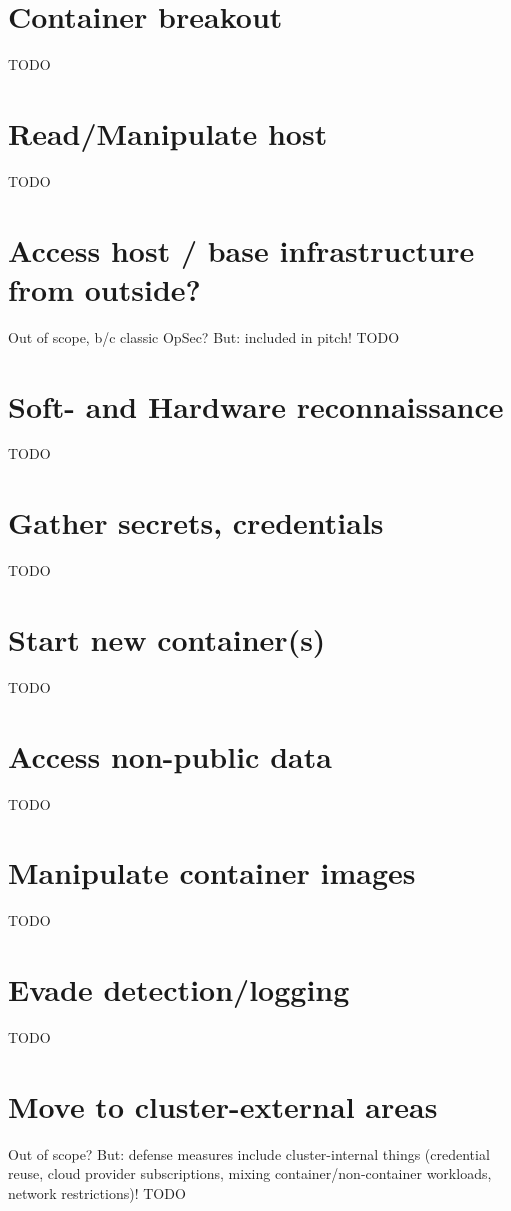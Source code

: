 \section{Container breakout}
TODO

\section{Read/Manipulate host}
TODO

\section{Access host / base infrastructure from outside?}
Out of scope, b/c classic OpSec? But: included in pitch!
TODO

\section{Soft- and Hardware reconnaissance}
TODO

\section{Gather secrets, credentials}
TODO

\section{Start new container(s)}
TODO

\section{Access non-public data}
TODO

\section{Manipulate container images}
TODO

\section{Evade detection/logging}
TODO

\section{Move to cluster-external areas}
Out of scope? But: defense measures include cluster-internal things (credential reuse, cloud provider subscriptions, mixing container/non-container workloads, network restrictions)!
TODO

